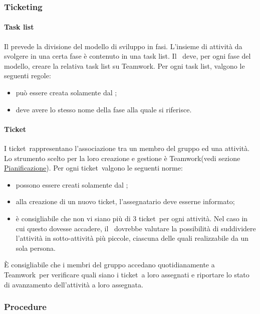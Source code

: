 \documentclass[../NormeProgetto.tex]{subfiles}
\begin{document}
	\subsubsection{Ticketing}
		\paragraph{Task list}
			Il \pianodiprogetto prevede la divisione del modello di sviluppo in fasi. L'insieme di attività da svolgere in una certa fase è contenuto in una task list. Il \responsabilediprogetto\ deve, per ogni fase del modello, creare la relativa task list su Teamwork. Per ogni task list, valgono le seguenti regole:
			\begin{itemize}
				\item può essere creata solamente dal \responsabilediprogetto;
				\item deve avere lo stesso nome della fase alla quale si riferisce.
			\end{itemize}
			
		\paragraph{Ticket}
			I ticket\g\ rappresentano l'associazione tra un membro del gruppo ed una attività. Lo strumento scelto per la loro creazione e gestione è Teamwork\g (vedi sezione \hyperref[sec: Pianificazione Teamwork]{Pianificazione}). Per ogni ticket\g\ valgono le seguenti norme:
			\begin{itemize}
				\item possono essere creati solamente dal \responsabilediprogetto;
				\item alla creazione di un nuovo ticket\g, l'assegnatario deve esserne informato;
				\item è consigliabile che non vi siano più di 3 ticket\g\ per ogni attività. Nel caso in cui questo dovesse accadere, il \responsabilediprogetto\ dovrebbe valutare la possibilità di suddividere l'attività in sotto-attività più piccole, ciascuna delle quali realizzabile da un sola persona.
			\end{itemize}			 
			 È consigliabile che i membri del gruppo accedano quotidianamente a Teamwork\g\ per verificare quali siano i ticket\g\ a loro assegnati e riportare lo stato di avanzamento dell'attività a loro assegnata.

		\subsubsection{Procedure}
\end{document}
